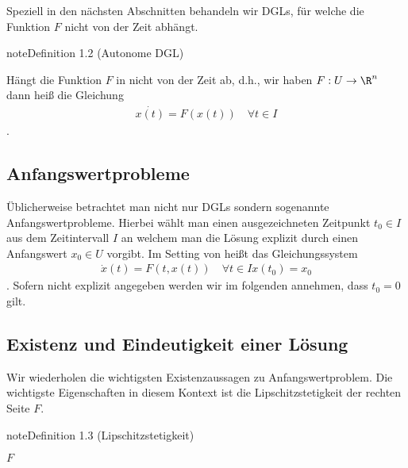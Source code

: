 \documentclass[letterpaper,10pt,english]{jupyterBook}
\begin{document}
Speziell in den nächsten Abschnitten behandeln wir DGLs, für welche die Funktion \(F\) nicht von der Zeit abhängt.
\label{ode/motivation:definition-1}
\begin{sphinxadmonition}{note}{Definition 1.2 (Autonome DGL)}



Hängt die Funktion \(F\) in {\hyperref[\detokenize{ode/motivation:def:DGL}]{}} nicht von der Zeit ab, d.h., wir haben \(F:U\rightarrow\R^n\) dann heiß die Gleichung
\begin{equation}\label{equation:ode/motivation:eq:DGL}
\begin{split}\dot{x(t)} = F(x(t))\quad\forall t\in I\end{split}
\end{equation}
.
\end{sphinxadmonition}


\subsection{Anfangswertprobleme}
\label{\detokenize{ode/motivation:anfangswertprobleme}}
Üblicherweise betrachtet man nicht nur DGLs sondern sogenannte Anfangswertprobleme. Hierbei wählt man einen ausgezeichneten Zeitpunkt \(t_0\in I\) aus dem Zeitintervall \(I\) an welchem man die Lösung explizit durch einen Anfangswert \(x_0\in U\) vorgibt. Im Setting von {\hyperref[\detokenize{ode/motivation:def:DGL}]{}} heißt
das Gleichungssystem
\begin{equation}\label{equation:ode/motivation:eq:AWP}
\begin{split}\dot{x}(t) = F(t, x(t))\quad\forall t\in I
x(t_0) = x_0\end{split}
\end{equation}
. Sofern nicht explizit angegeben werden wir im folgenden annehmen, dass \(t_0=0\) gilt.


\subsection{Existenz und Eindeutigkeit einer Lösung}
\label{\detokenize{ode/motivation:existenz-und-eindeutigkeit-einer-losung}}
Wir wiederholen die wichtigsten Existenzaussagen zu Anfangswertproblem. Die wichtigste Eigenschaften in diesem Kontext ist die Lipschitzstetigkeit der rechten Seite \(F\).
\label{ode/motivation:definition-2}
\begin{sphinxadmonition}{note}{Definition 1.3 (Lipschitzstetigkeit)}



\(F\)
\end{sphinxadmonition}
\end{document}
